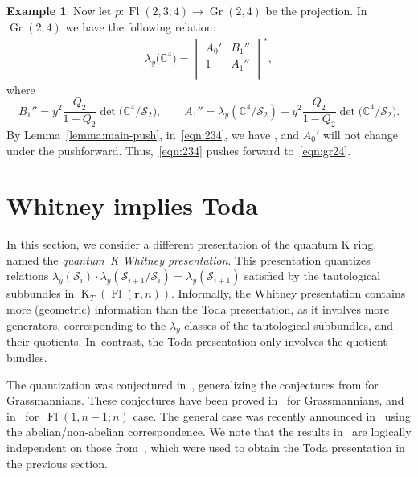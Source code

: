 \documentclass[pdftex]{sigma}
\numberwithin{equation}{section}
\theoremstyle{definition}
\newtheorem{Example}[Theorem]{Example}
\DeclareMathOperator{\Gr}{Gr}
\DeclareMathOperator{\Fl}{Fl}
\DeclareMathOperator{\K}{K}
\newcommand{\bfr}{{\mathbf r}}
\newcommand{\cS}{{\mathcal S}}
\begin{document}
\begin{Example}
Now let $p\colon \Fl(2,3;4) \to \Gr(2,4)$ be the projection. In $\Gr(2,4)$ we have the following relation:
\begin{gather}\label{eqn:gr24}
 \lambda_y\bigl(\mathbb{C}^4\bigr)=\begin{vmatrix}
 A_0' & B_1'' \\
 1 & A_1'' \\
 \end{vmatrix}^\star ,
\end{gather}
where
\[
B_1'' = y^2\frac{Q_2}{1-Q_2}\det\bigl(\mathbb{C}^4/{\mathcal{S}_2}\bigr) ,\qquad A_1'' = \lambda_y(\mathbb{C}^4/\mathcal{S}_2)+ y^2\frac{Q_2}{1-Q_2}\det\bigl(\mathbb{C}^4/{\mathcal{S}_2}\bigr).
\]
By Lemma~\ref{lemma:main-push}, in~\eqref{eqn:234}, we have ,  and $A_0'$ will not change under the pushforward. Thus,~\eqref{eqn:234} pushes forward to~\eqref{eqn:gr24}.
\end{Example}

\section{Whitney implies Toda}\label{sec:whitney}
In this section, we consider a different presentation of the quantum K ring, named the
{\em quantum~K Whitney presentation}.
This presentation quantizes
 relations $\lambda_y(\cS_i) \cdot \lambda_y(\cS_{i+1}/\cS_i) = \lambda_y(\cS_{i+1})$
 satisfied by the tautological subbundles in $\K_T(\Fl(\bfr,n))$. Informally, the
 Whitney presentation contains more (geometric) information than the Toda presentation,
 as it involves more generators, corresponding to the $\lambda_y$
 classes of the tautological subbundles, and their quotients. In~contrast, the Toda presentation
 only involves the quotient bundles.




The quantization was conjectured in~\cite{gu2023quantum,GMSXZZ:QKW},
generalizing the conjectures from
\cite{Gu:2020zpg} for Grassmannians. These conjectures have been proved in~\cite{gu2022quantum}
for Grassmannians, and in~\cite{GMSXZZ:QKW} for~$\Fl(1,n-1;n)$ case. The general case was recently announced in~\cite{huq2024quantum} using the abelian/non-abelian correspondence.
We note that the results in~\cite{huq2024quantum} are logically independent on those from~\cite{maeno2023presentation}, which were used to obtain the Toda presentation in the previous section.
\end{document}
